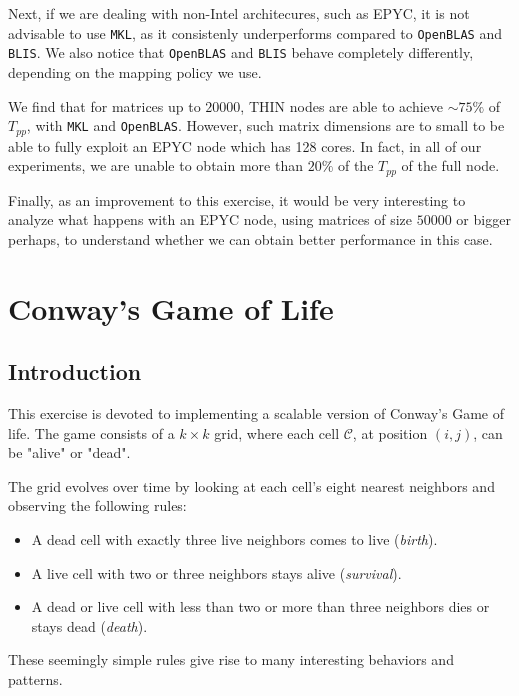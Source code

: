 \documentclass{report}
\begin{document}
Next, if we are dealing with non-Intel architecures, such as EPYC, it is not 
advisable to use \texttt{MKL}, as it consistenly underperforms compared to 
\texttt{OpenBLAS} and \texttt{BLIS}. We also notice that \texttt{OpenBLAS} and 
\texttt{BLIS} behave completely differently, depending on the mapping policy we 
use.

We find that for matrices up to $20000$, THIN nodes are able to achieve 
$\sim 75\%$ of $T_{pp}$, with \texttt{MKL} and \texttt{OpenBLAS}. However, 
such matrix dimensions are to small to be able to fully exploit an EPYC node 
which has 128 cores. In fact, in all of our experiments, we are unable to obtain 
more than $20\%$ of the $T_{pp}$ of the full node.

Finally, as an improvement to this exercise, it would be very interesting to 
analyze what happens with an EPYC node, using matrices of size $50000$ or bigger 
perhaps, to understand whether we can obtain better performance in this case.

\chapter{Conway's Game of Life}


\section{Introduction}

This exercise is devoted to implementing a scalable version of Conway's Game of 
life\cite{conway}. The game consists of a $k\times k$ grid, where each cell 
$\mathcal{C}$, at position $(i,j)$, can be "alive" or "dead".

The grid evolves over time by looking at each cell's  eight nearest 
neighbors and observing the following rules: 

\begin{itemize}
    \item A dead cell with exactly three live neighbors comes to live (\textit{birth}).
    \item A live cell with two or three neighbors stays alive (\textit{survival}).
    \item A dead or live cell with less than two or more than three neighbors dies 
        or stays dead (\textit{death}).
\end{itemize}

These seemingly simple rules give rise to many interesting behaviors and 
patterns\cite{conway_patterns}. 
\end{document}
